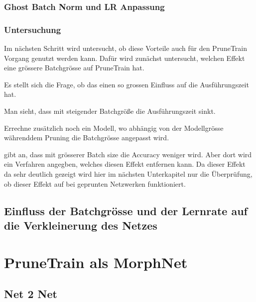 \subsubsection{Ghost Batch Norm und LR Anpassung}

\subsubsection{Untersuchung}
Im nächsten Schritt wird untersucht, ob diese Vorteile auch für den PruneTrain Vorgang genutzt werden kann. Dafür wird zunächst untersucht, welchen Effekt eine grössere Batchgrösse auf PruneTrain hat.




Es stellt sich die Frage, ob das einen so grossen Einfluss auf die Ausführungszeit hat.



Man sieht, dass mit steigender Batchgröße die Ausführungszeit sinkt. 

Errechne zusätzlich noch ein Modell, wo abhängig von der Modellgrösse währenddem Pruning die Batchgrösse angepasst wird.



\cite{largeBatch} gibt an, dass mit grösserer Batch size die Accuracy weniger wird. Aber dort wird ein Verfahren angegben, welches diesen Effekt entfernen kann.
Da dieser Effekt da sehr deutlich gezeigt wird hier im nächsten Unterkapitel nur die Überprüfung, ob dieser Effekt auf bei geprunten Netzwerken funktioniert.
\subsection{Einfluss der Batchgrösse und der Lernrate auf die Verkleinerung des Netzes}



\color{black}
\section{PruneTrain als MorphNet}

\subsection{Net 2 Net}

